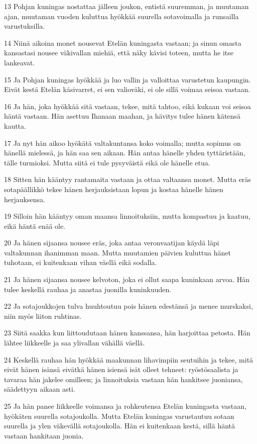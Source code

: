 \par 13 Pohjan kuningas nostattaa jälleen joukon, entistä suuremman, ja muutaman ajan, muutaman vuoden kuluttua hyökkää suurella sotavoimalla ja runsailla varustuksilla.
\par 14 Niinä aikoina monet nousevat Etelän kuningasta vastaan; ja sinun omasta kansastasi nousee väkivallan miehiä, että näky kävisi toteen, mutta he itse lankeavat.
\par 15 Ja Pohjan kuningas hyökkää ja luo vallin ja valloittaa varustetun kaupungin. Eivät kestä Etelän käsivarret, ei sen valioväki, ei ole sillä voimaa seisoa vastaan.
\par 16 Ja hän, joka hyökkää sitä vastaan, tekee, mitä tahtoo, eikä kukaan voi seisoa häntä vastaan. Hän asettuu Ihanaan maahan, ja hävitys tulee hänen kätensä kautta.
\par 17 Ja nyt hän aikoo hyökätä valtakuntansa koko voimalla; mutta sopimus on hänellä mielessä, ja hän saa sen aikaan. Hän antaa hänelle yhden tyttäristään, tälle turmioksi. Mutta siitä ei tule pysyväistä eikä ole hänelle etua.
\par 18 Sitten hän kääntyy rantamaita vastaan ja ottaa valtaansa monet. Mutta eräs sotapäällikkö tekee hänen herjauksistaan lopun ja kostaa hänelle hänen herjauksensa.
\par 19 Silloin hän kääntyy oman maansa linnoituksiin, mutta kompastuu ja kaatuu, eikä häntä enää ole.
\par 20 Ja hänen sijaansa nousee eräs, joka antaa veronvaatijan käydä läpi valtakunnan ihanimman maan. Mutta muutamien päivien kuluttua hänet tuhotaan, ei kuitenkaan vihan väellä eikä sodalla.
\par 21 Ja hänen sijaansa nousee kelvoton, joka ei ollut saapa kuninkaan arvoa. Hän tulee keskellä rauhaa ja anastaa juonilla kuninkuuden.
\par 22 Ja sotajoukkojen tulva huuhtoutuu pois hänen edestänsä ja menee murskaksi, niin myös liiton ruhtinas.
\par 23 Siitä saakka kun liittoudutaan hänen kanssansa, hän harjoittaa petosta. Hän lähtee liikkeelle ja saa ylivallan vähällä väellä.
\par 24 Keskellä rauhaa hän hyökkää maakunnan lihavimpiin seutuihin ja tekee, mitä eivät hänen isänsä eivätkä hänen isiensä isät olleet tehneet: ryöstösaalista ja tavaraa hän jakelee omilleen; ja linnoituksia vastaan hän hankitsee juoniansa, säädettyyn aikaan asti.
\par 25 Ja hän panee liikkeelle voimansa ja rohkeutensa Etelän kuningasta vastaan, hyökäten suurella sotajoukolla. Mutta Etelän kuningas varustautuu sotaan suurella ja ylen väkevällä sotajoukolla. Hän ei kuitenkaan kestä, sillä häntä vastaan hankitaan juonia.
